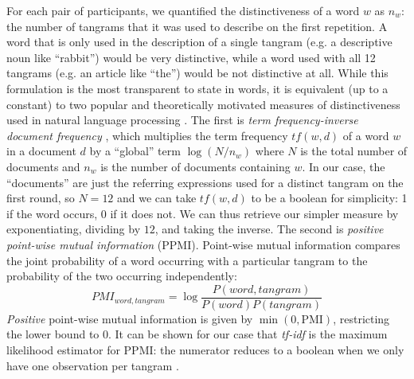 \documentclass[alpha-refs]{wiley-article}
\begin{document}
For each pair of participants, we quantified the distinctiveness of a word $w$ as $n_w$: the number of tangrams that it was used to describe on the first repetition. 
A word that is only used in the description of a single tangram (e.g. a descriptive noun like ``rabbit'') would be very distinctive, while a word used with all 12 tangrams (e.g. an article like ``the'') would be not distinctive at all.
While this formulation is the most transparent to state in words, it is equivalent (up to a constant) to two popular  and theoretically motivated measures of distinctiveness used in natural language processing \citep{salton1988term}.
The first is \emph{term frequency-inverse document frequency} \citep[tf-idf,][]{sparck1972statistical}, which multiplies the term frequency $tf(w,d)$ of a word $w$ in a document $d$ by a ``global'' term $\log(N/n_w)$ where $N$ is the total number of documents and $n_w$ is the number of documents containing $w$. 
In our case, the ``documents'' are just the referring expressions used for a distinct tangram on the first round, so $N=12$ and we can take $tf(w,d)$ to be a boolean for simplicity: 1 if the word occurs, 0 if it does not.
We can thus retrieve our simpler measure by exponentiating, dividing by $12$, and taking the inverse.
The second is \emph{positive point-wise mutual information} (PPMI). 
Point-wise mutual information compares the joint probability of a word occurring with a particular tangram to the probability of the two occurring independently: 
$$PMI_{word, tangram} = \log\frac{P(word, tangram)}{P(word)P(tangram)}$$
\emph{Positive} point-wise mutual information is given by $\min(0, \textrm{PMI})$, restricting the lower bound to 0. 
It can be shown for our case that \emph{tf-idf} is the maximum likelihood estimator for PPMI: the numerator reduces to a boolean when we only have one observation per tangram \citep{robertson2004understanding}.
\end{document}
